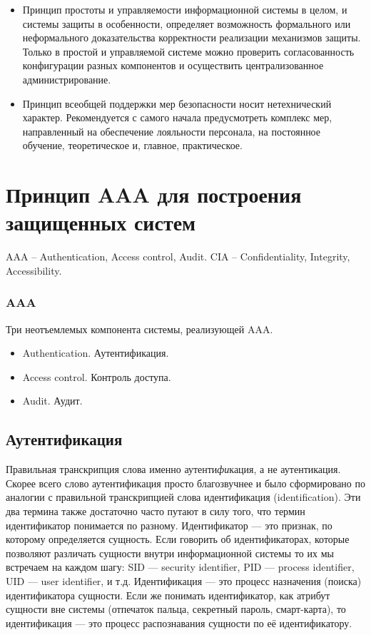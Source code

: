 \begin{itemize}
\item Принцип простоты и управляемости информационной системы в целом, и системы защиты в особенности, определяет возможность формального или неформального доказательства корректности реализации механизмов защиты. Только в простой и управляемой системе можно проверить согласованность конфигурации разных компонентов и осуществить централизованное администрирование.

\item Принцип всеобщей поддержки мер безопасности носит нетехнический характер. Рекомендуется с самого начала предусмотреть комплекс мер, направленный на обеспечение лояльности персонала, на постоянное обучение, теоретическое и, главное, практическое.

\end{itemize}

\section{Принцип AAA для построения защищенных систем}
AAA – Authentication, Access control, Audit. CIA – Confidentiality, Integrity, Accessibility.

\begin{frame}
\frametitle{AAA}
Три неотъемлемых компонента системы, реализующей AAA.
\begin{itemize}
\item Authentication. Аутентификация.
\item Access control. Контроль доступа.
\item Audit. Аудит.
\end{itemize}
\end{frame}


\subsection{Аутентификация}


Правильная транскрипция слова именно аутенти\emph{фи}кация, а не аутентикация. Скорее всего слово аутентификация просто благозвучнее и было сформировано по аналогии с правильной транскрипцией слова идентификация (identification). Эти два термина также достаточно часто путают в силу того, что термин идентификатор понимается по разному. Идентификатор --- это признак, по которому определяется сущность. Если говорить об идентификаторах, которые позволяют различать сущности внутри информационной системы то их мы встречаем на каждом шагу: SID --- security identifier, PID --- process identifier, UID --- user identifier, и т.д. Идентификация --- это процесс назначения (поиска) идентификатора сущности. Если же понимать идентификатор, как атрибут сущности вне системы (отпечаток пальца, секретный пароль, смарт-карта), то идентификация --- это процесс распознавания сущности по её идентификатору.

